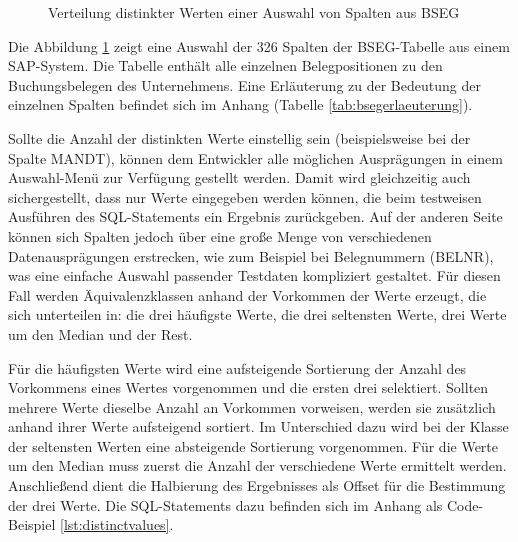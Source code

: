 
\begin{figure}
\centering
	\caption{Verteilung distinkter Werten einer Auswahl von Spalten aus BSEG}
	\label{fig:bseg}
\end{figure}

Die Abbildung \ref{fig:bseg} zeigt eine Auswahl der 326 Spalten der BSEG-Tabelle aus einem SAP-System.
Die Tabelle enthält alle einzelnen Belegpositionen zu den Buchungsbelegen des Unternehmens.
Eine Erläuterung zu der Bedeutung der einzelnen Spalten befindet sich im Anhang (Tabelle \ref{tab:bsegerlaeuterung}).

Sollte die Anzahl der distinkten Werte einstellig sein (beispielsweise bei der Spalte MANDT), können dem Entwickler alle möglichen Ausprägungen in einem Auswahl-Menü zur Verfügung gestellt werden.
Damit wird gleichzeitig auch sichergestellt, dass nur Werte eingegeben werden können, die beim testweisen Ausführen des SQL-Statements ein Ergebnis zurückgeben.
Auf der anderen Seite können sich Spalten jedoch über eine große Menge von verschiedenen Datenausprägungen erstrecken, wie zum Beispiel bei Belegnummern (BELNR), was eine einfache Auswahl passender Testdaten kompliziert gestaltet.
Für diesen Fall werden Äquivalenzklassen anhand der Vorkommen der Werte erzeugt, die sich unterteilen in: die drei häufigste Werte, die drei seltensten Werte, drei Werte um den Median und der Rest.

Für die häufigsten Werte wird eine aufsteigende Sortierung der Anzahl des Vorkommens eines Wertes vorgenommen und die ersten drei selektiert.
Sollten mehrere Werte dieselbe Anzahl an Vorkommen vorweisen, werden sie zusätzlich anhand ihrer Werte aufsteigend sortiert.
Im Unterschied dazu wird bei der Klasse der seltensten Werten eine absteigende Sortierung vorgenommen.
Für die Werte um den Median muss zuerst die Anzahl der verschiedene Werte ermittelt werden.
Anschließend dient die Halbierung des Ergebnisses als Offset für die Bestimmung der drei Werte.
Die SQL-Statements dazu befinden sich im Anhang als Code-Beispiel \ref{lst:distinctvalues}.

